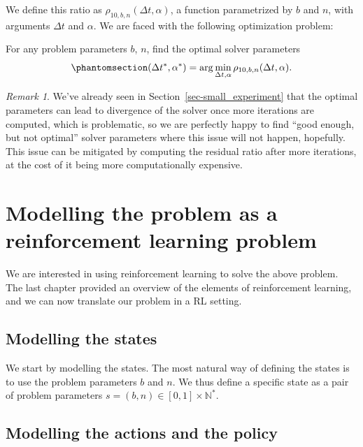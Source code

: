 \documentclass[
  letterpaper,
]{report}
\theoremstyle{definition}
\theoremstyle{plain}
\theoremstyle{definition}
\theoremstyle{remark}
\newtheorem*{remark}{Remark}
\begin{document}
We define this ratio as \(\rho_{10, b, n}(\Delta t, \alpha)\), a
function parametrized by \(b\) and \(n\), with arguments \(\Delta t\)
and \(\alpha\). We are faced with the following optimization problem:

For any problem parameters \(b\), \(n\), find the optimal solver
parameters
\begin{equation}\phantomsection\label{eq-optimization_problem}{
(\Delta t^*, \alpha^*) =  \arg \min_{\Delta t, \alpha} \rho_{10, b , n}(\Delta t, \alpha).
}\end{equation}

\begin{remark}
We've already seen in Section~\ref{sec-small_experiment} that the
optimal parameters can lead to divergence of the solver once more
iterations are computed, which is problematic, so we are perfectly happy
to find ``good enough, but not optimal'' solver parameters where this
issue will not happen, hopefully. This issue can be mitigated by
computing the residual ratio after more iterations, at the cost of it
being more computationally expensive.
\end{remark}

\section{Modelling the problem as a reinforcement learning
problem}\label{modelling-the-problem-as-a-reinforcement-learning-problem}

We are interested in using reinforcement learning to solve the above
problem. The last chapter provided an overview of the elements of
reinforcement learning, and we can now translate our problem in a RL
setting.

\subsection*{Modelling the states}\label{modelling-the-states}

We start by modelling the states. The most natural way of defining the
states is to use the problem parameters \(b\) and \(n\). We thus define
a specific state as a pair of problem parameters
\(s = (b,n) \in [0,1]\times \mathbb{N^*}\).

\subsection*{Modelling the actions and the
policy}\label{modelling-the-actions-and-the-policy}
\end{document}
